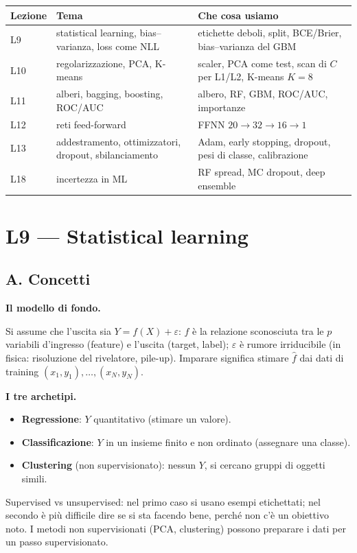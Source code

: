 \documentclass[11pt,a4paper]{article}
\newcommand{\dom}[1]{\par\smallskip\noindent\textbf{#1}\par\nopagebreak}
\begin{document}
\begin{center}
\begin{tabular}{p{1.4cm}p{5.6cm}p{7.4cm}}
\toprule
Lezione & Tema & Che cosa usiamo \\
\midrule
L9 & statistical learning, bias--varianza, loss come NLL & etichette deboli, split, BCE/Brier, bias--varianza del GBM \\
L10 & regolarizzazione, PCA, K-means & scaler, PCA come test, scan di $C$ per L1/L2, K-means $K=8$ \\
L11 & alberi, bagging, boosting, ROC/AUC & albero, RF, GBM, ROC/AUC, importanze \\
L12 & reti feed-forward & FFNN $20\!\to\!32\!\to\!16\!\to\!1$ \\
L13 & addestramento, ottimizzatori, dropout, sbilanciamento & Adam, early stopping, dropout, pesi di classe, calibrazione \\
L18 & incertezza in ML & RF spread, MC dropout, deep ensemble \\
\bottomrule
\end{tabular}
\end{center}

\clearpage
\section{L9 --- Statistical learning}
\subsection*{A. Concetti}

\dom{Il modello di fondo.} Si assume che l'uscita sia $Y=f(X)+\varepsilon$: $f$ \`e la relazione sconosciuta tra le $p$ variabili d'ingresso (feature) e l'uscita (target, label); $\varepsilon$ \`e rumore irriducibile (in fisica: risoluzione del rivelatore, pile-up). Imparare significa stimare $\hat f$ dai dati di training $(x_1,y_1),\dots,(x_N,y_N)$.

\dom{I tre archetipi.}
\begin{itemize}
\item \textbf{Regressione}: $Y$ quantitativo (stimare un valore).
\item \textbf{Classificazione}: $Y$ in un insieme finito e non ordinato (assegnare una classe).
\item \textbf{Clustering} (non supervisionato): nessun $Y$, si cercano gruppi di oggetti simili.
\end{itemize}
Supervised vs unsupervised: nel primo caso si usano esempi etichettati; nel secondo \`e pi\`u difficile dire se si sta facendo bene, perch\'e non c'\`e un obiettivo noto. I metodi non supervisionati (PCA, clustering) possono preparare i dati per un passo supervisionato.
\end{document}
